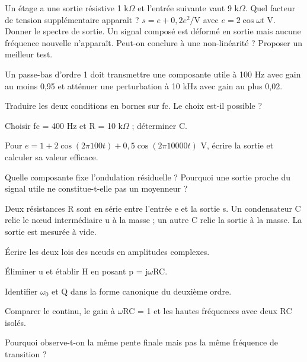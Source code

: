 Un étage a une sortie résistive 1 k$\Omega$ et l’entrée suivante vaut 9 k$\Omega$. Quel facteur de tension supplémentaire apparaît ?
$s=e+0{,}2e^2/\mathrm V$ avec $e=2\cos\omega t$ V. Donner le spectre de sortie.
Un signal composé est déformé en sortie mais aucune fréquence nouvelle n’apparaît. Peut-on conclure à une non-linéarité ? Proposer un meilleur test.


\label{ch07-ex-D1}
Un passe-bas d’ordre 1 doit transmettre une composante utile à 100 Hz avec gain au moins 0,95 et atténuer une perturbation à 10 kHz avec gain au plus 0,02.\begin{questions}
\item Traduire les deux conditions en bornes sur fc. Le choix est-il possible ?
\item Choisir fc = 400 Hz et R = 10 k$\Omega$ ; déterminer C.
\item Pour $e=1+2\cos(2\pi100t)+0{,}5\cos(2\pi10000t)$ V, écrire la sortie et calculer sa valeur efficace.
\item Quelle composante fixe l’ondulation résiduelle ? Pourquoi une sortie proche du signal utile ne constitue-t-elle pas un moyenneur ?
\end{questions}


\label{ch07-ex-D2}
Deux résistances R sont en série entre l’entrée e et la sortie s. Un condensateur C relie le nœud intermédiaire u à la masse ; un autre C relie la sortie à la masse. La sortie est mesurée à vide.\begin{questions}
\item Écrire les deux lois des nœuds en amplitudes complexes.
\item Éliminer u et établir H en posant p = j\ensuremath{\omega}RC.
\item Identifier \ensuremath{\omega_0} et Q dans la forme canonique du deuxième ordre.
\item Comparer le continu, le gain à \ensuremath{\omega}RC = 1 et les hautes fréquences avec deux RC isolés.
\item Pourquoi observe-t-on la même pente finale mais pas la même fréquence de transition ?
\end{questions}


